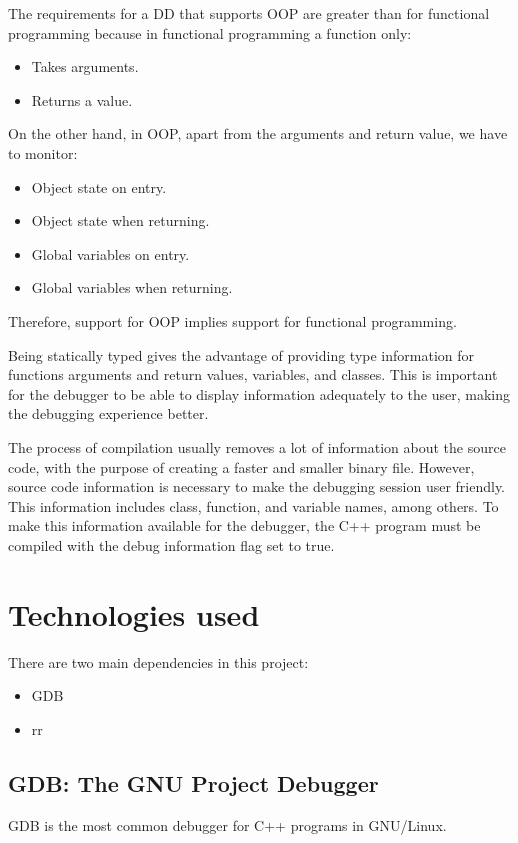 The requirements for a DD that supports OOP are greater than for functional programming because in functional programming a function only:
\begin{itemize}
    \item Takes arguments.
    \item Returns a value.
\end{itemize}
On the other hand, in OOP, apart from the arguments and return value, we have to monitor:
\begin{itemize}
    \item Object state on entry.
    \item Object state when returning.
    \item Global variables on entry.
    \item Global variables when returning.
\end{itemize}
Therefore, support for OOP implies support for functional programming.

Being statically typed gives the advantage of providing type information for functions arguments and return values, variables, and classes. This is important for the debugger to be able to display information adequately to the user, making the debugging experience better.

The process of compilation usually removes a lot of information about the source code, with the purpose of creating a faster and smaller binary file.
However, source code information is necessary to make the debugging session user friendly. This information includes class, function, and variable names, among others.
To make this information available for the debugger, the C++ program must be compiled with the debug information flag set to true.

\section{Technologies used}
There are two main dependencies in this project:
\begin{itemize}
    \item GDB
    \item rr
\end{itemize}
\subsection{GDB: The GNU Project Debugger}
GDB is the most common debugger for C++ programs in GNU/Linux.

